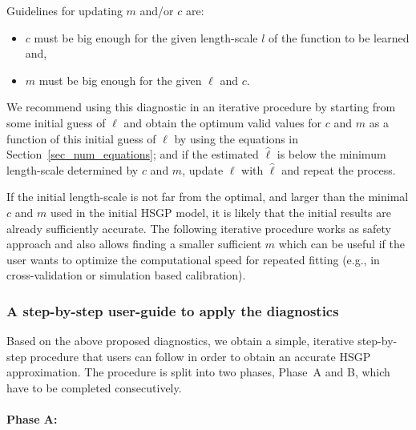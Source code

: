 Guidelines for updating $m$ and/or $c$ are:
%
\begin{itemize}
	\item $c$ must be big enough for the given length-scale $l$ of the function to be learned and,
	\item $m$ must be big enough for the given $\ell$ and $c$. 
\end{itemize}

We recommend using this diagnostic in an iterative procedure by starting from some initial guess of $\ell$ and obtain the optimum valid values for $c$ and $m$ as a function of this initial guess of $\ell$ by using the equations in Section~\ref{sec_num_equations}; and if the estimated $\hat{\ell}$ is below the minimum length-scale determined by $c$ and $m$, update $\ell$ with $\hat{\ell}$ and repeat the process. 

If the initial length-scale is not far from the optimal, and larger than the minimal $c$ and $m$ used in the initial HSGP model, it is likely that the initial results are already sufficiently accurate. The following iterative procedure works as safety approach and also allows finding a smaller sufficient $m$ which can be useful if the user wants to optimize the computational speed for repeated fitting (e.g., in cross-validation or simulation based calibration).


\subsubsection{A step-by-step user-guide to apply the diagnostics} \label{sec_user_guide}

Based on the above proposed diagnostics, we obtain a simple, iterative step-by-step procedure that users can follow in order to obtain an accurate HSGP approximation. The procedure is split into two phases, Phase~A and B, which have to be completed consecutively.

\paragraph*{Phase A:}

